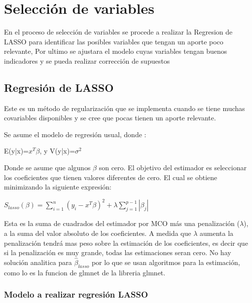\documentclass[
]{article}
\begin{document}
\hypertarget{selecciuxf3n-de-variables}{%
\section{Selección de variables}\label{selecciuxf3n-de-variables}}

En el proceso de selección de variables se procede a realizar la
Regresion de LASSO para identificar las posibles variables que tengan un
aporte poco relevante, Por ultimo se ajustara el modelo cuyas variables
tengan buenos indicadores y se pueda realizar corrección de supuestos

\hypertarget{regresiuxf3n-de-lasso}{%
\subsection{Regresión de LASSO}\label{regresiuxf3n-de-lasso}}

Este es un método de regularización que se implementa cuando se tiene
muchas covariables disponibles y se cree que pocas tienen un aporte
relevante.

Se asume el modelo de regresión usual, donde :

\begin{center}
E(y|x)=$x^T\beta$, y V(y|x)=$\sigma^2$
\end{center}

Donde se asume que algunos \(\beta\) son cero. El objetivo del estimador
es seleccionar los coeficientes que tienen valores diferentes de cero.
El cual se obtiene minimizando la siguiente expresión:

\begin{center}
$S_{lasso}(\beta)=\sum_{i=1}^{n}({y_{i}-x^
T}\beta)^2+\lambda\sum_{j=1}^{p-1}|\beta_{j}|$
\end{center}

Esta es la suma de cuadrados del estimador por MCO más una penalización
(\(\lambda\)), a la suma del valor absoluto de los coeficientes. A
medida que \(\lambda\) aumenta la penalización tendrá mas peso sobre la
estimación de los coeficientes, es decir que si la penalización es muy
grande, todas las estimaciones seran cero. No hay solución analitica
para \(\hat{\beta}_{lasso}\) por lo que se usan algoritmos para la
estimación, como lo es la funcion de glmnet de la libreria glmnet.

\hypertarget{modelo-a-realizar-regresiuxf3n-lasso}{%
\subsubsection{Modelo a realizar regresión
LASSO}\label{modelo-a-realizar-regresiuxf3n-lasso}}
\end{document}
